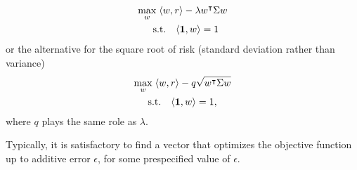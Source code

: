 \begin{refsection}
\begin{itemize}
    \begin{equation}\label{eq:quadratic_objective}
    \begin{split}
    \max_{w}\; \langle w,r \rangle- \lambda&w^\intercal \Sigma w\\
    \mathrm{s.t.}\quad \langle\mathbf{1}, w\rangle &=1
    \end{split}
    \end{equation}
    or the alternative for the square root of risk (standard deviation rather than variance)
    \begin{equation}
    \begin{split}
    \max_{w}\; \langle w,r\rangle- q&\sqrt{w^\intercal \Sigma w}\\
    \mathrm{s.t.}\quad \langle\mathbf{1}, w\rangle &=1,
    \end{split}
    \end{equation}
    where $q$ plays the same role as $\lambda$.
\end{itemize}
Typically, it is satisfactory to find a vector that optimizes the objective function up to additive error $\epsilon$, for some prespecified value of $\epsilon$. 



\end{refsection}
